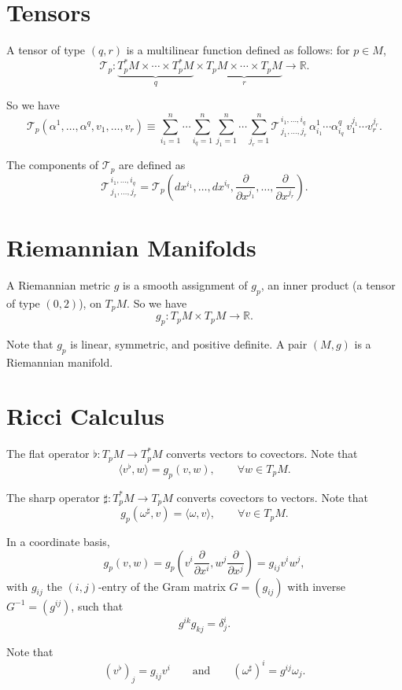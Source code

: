 \documentclass[11pt]{report}
\theoremstyle{definition}
\theoremstyle{plain}
\theoremstyle{remark}
\newcommand{\R}{\mathbb{R}}
\begin{document}
\section{Tensors}

A tensor of type $(q,r)$ is a multilinear function defined as follows: for $p\in M$,
\[
\mathcal T_p:
\underbrace{T_p^*M\times \cdots \times T_p^*M}_{q}
\times
\underbrace{T_pM\times \cdots \times T_pM}_{r}
\longrightarrow \R.
\]

So we have
\[
\mathcal T_p(\alpha^1,\dots,\alpha^q,v_1,\dots,v_r)
\equiv
\sum_{i_1=1}^n\cdots\sum_{i_q=1}^n
\sum_{j_1=1}^n\cdots\sum_{j_r=1}^n
\mathcal T^{\,i_1,\dots,i_q}_{\,j_1,\dots,j_r}
\,\alpha^1_{i_1}\cdots \alpha^q_{i_q}\,v_1^{j_1}\cdots v_r^{j_r}.
\]

The components of $\mathcal T_p$ are defined as
\[
\mathcal T^{\,i_1,\dots,i_q}_{\,j_1,\dots,j_r}
=
\mathcal T_p\left(dx^{i_1},\dots,dx^{i_q},
\frac{\partial}{\partial x^{j_1}},\dots,\frac{\partial}{\partial x^{j_r}}\right).
\]

\section{Riemannian Manifolds}

A Riemannian metric $g$ is a smooth assignment of $g_p$, an inner product (a tensor of type $(0,2)$), on $T_pM$. So we have
\[
g_p:T_pM\times T_pM\to \R.
\]

Note that $g_p$ is linear, symmetric, and positive definite. A pair $(M,g)$ is a Riemannian manifold.

\section{Ricci Calculus}

The flat operator $\flat:T_pM\to T_p^*M$ converts vectors to covectors. Note that
\[
\langle v^\flat,w\rangle = g_p(v,w),
\qquad \forall w\in T_pM.
\]

The sharp operator $\sharp:T_p^*M\to T_pM$ converts covectors to vectors. Note that
\[
g_p(\omega^\sharp,v)=\langle\omega,v\rangle,
\qquad \forall v\in T_pM.
\]

In a coordinate basis,
\[
g_p(v,w)=g_p\left(v^i\frac{\partial}{\partial x^i},w^j\frac{\partial}{\partial x^j}\right)=g_{ij}v^iw^j,
\]
with $g_{ij}$ the $(i,j)$-entry of the Gram matrix $G=(g_{ij})$ with inverse $G^{-1}=(g^{ij})$, such that
\[
g^{ik}g_{kj}=\delta_j^i.
\]

Note that
\[
(v^\flat)_j=g_{ij}v^i
\qquad \text{and} \qquad
(\omega^\sharp)^i=g^{ij}\omega_j.
\]
\end{document}
